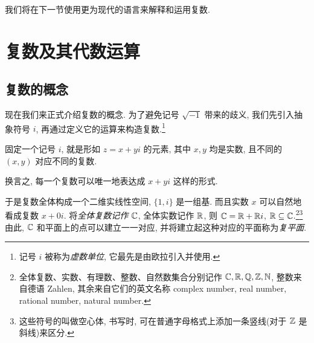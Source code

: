 我们将在下一节使用更为现代的语言来解释和运用复数.


\section{复数及其代数运算}

\subsection{复数的概念}

现在我们来正式介绍复数的概念.
为了避免记号 $\sqrt{-1}$ 带来的歧义, 我们先引入抽象符号 $i$, 再通过定义它的运算来构造复数.\footnote{记号 $i$ 被称为\emph{虚数单位}, 它最先是由欧拉引入并使用.}

\begin{definition}[复数]
  固定一个记号 $i$, 就是形如 $z=x+yi$ 的元素, 其中 $x,y$ 均是实数, 且不同的 $(x,y)$ 对应不同的复数.
\end{definition}

换言之, 每一个复数可以唯一地表达成 $x+yi$ 这样的形式.

于是复数全体构成一个二维实线性空间, $\{1,i\}$ 是一组基. 而且实数 $x$ 可以自然地看成复数 $x+0i$.
将\emph{全体复数记作 ${\mathbb{C}}$}, 全体实数记作 ${\mathbb{R}}$, 则 ${\mathbb{C}}={\mathbb{R}}+{\mathbb{R}} i$, ${\mathbb{R}}\subseteq {\mathbb{C}}$.\footnote{
  全体复数、实数、有理数、整数、自然数集合分别记作 ${\mathbb{C}},{\mathbb{R}},{\mathbb{Q}},{\mathbb{Z}},{\mathbb{N}}$, 整数来自德语 Zahlen, 其余来自它们的英文名称 complex number, real number, rational number, natural number.
}\footnote{
  这些符号的叫做空心体, 书写时, 可在普通字母格式上添加一条竖线(对于 ${\mathbb{Z}}$ 是斜线)来区分.
}
由此, ${\mathbb{C}}$ 和平面上的点可以建立一一对应, 并将建立起这种对应的平面称为\emph{复平面}.

